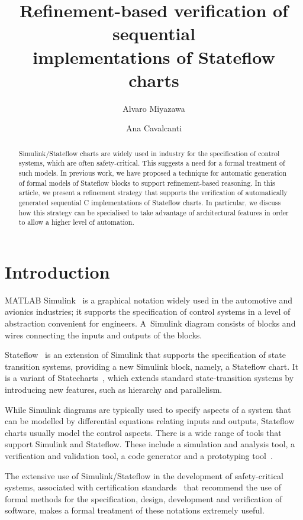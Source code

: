 \documentclass[submission]{eptcs}
\title{Refinement-based verification of sequential\\implementations of Stateflow charts}
\author{Alvaro Miyazawa
\institute{Department of Computer Science\\University of York}
\email{alvarohm@cs.york.ac.uk}
\and
Ana Cavalcanti
\institute{Department of Computer Science\\University of York}
\email{ana.cavalcanti@cs.york.ac.uk}
}
\begin{document}
\maketitle

\begin{abstract}
Simulink/Stateflow charts are widely used in industry for the
specification of control systems, which are often safety-critical. 
This suggests a need for a formal treatment of such models. In previous work,
we have proposed a technique for automatic generation of formal models
of Stateflow blocks to support refinement-based reasoning. In this article, we present a refinement strategy that supports
the verification of automatically generated sequential C implementations
of Stateflow charts.
In particular, we discuss how this strategy can be specialised to
take advantage of architectural features in order to allow a higher level
of automation.
\end{abstract}

\section{Introduction}

MATLAB Simulink~\cite{Simulink} is a graphical notation widely used in the automotive and avionics industries; it
supports the specification of control systems in a level of abstraction convenient for engineers.
A~Simulink diagram consists of blocks and wires connecting the inputs
and outputs of the blocks.

Stateflow~\cite{Stateflow} is an extension of Simulink that supports the specification of state transition systems, providing a new Simulink block, namely, a Stateflow chart.
It is a variant of Statecharts~\cite{Harel1987}, which extends standard state-transition systems by introducing new features,
such as hierarchy and parallelism.

While Simulink diagrams are typically used to specify aspects of a system that can be modelled by differential
equations relating inputs and outputs, Stateflow charts usually model the control aspects. There is a wide range of
tools that support Simulink and Stateflow. These include a simulation and analysis tool, a verification and validation tool, a code generator
and a prototyping tool~\cite{Simulink,Stateflow,RealTimeWorkshop}.

The extensive use of Simulink/Stateflow in the development of safety-critical systems, associated with
certification standards~\cite{BS2002, DO178b} that recommend the use of formal methods for the specification, design,
development and verification of software, makes a formal treatment of these notations extremely useful.
\end{document}
